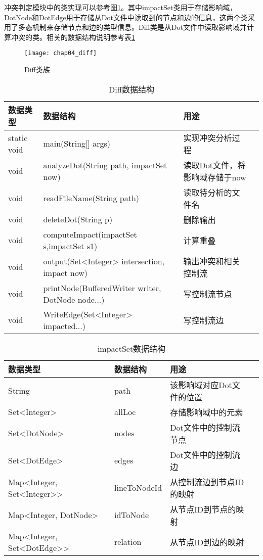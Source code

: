 冲突判定模块中的类实现可以参考图\ref {diff}。其中impactSet类用于存储影响域，DotNode和DotEdge用于存储从Dot文件中读取到的节点和边的信息，这两个类采用了多态机制来存储节点和边的类型信息。Diff类是从Dot文件中读取影响域并计算冲突的类。相关的数据结构说明参考表\ref {diff_data}

\begin{figure}[H]
	\centering
	\texttt{[image: chap04\_diff]}
	\caption {Diff类族}
	\label {diff}	
\end{figure}

\begin{table}[H]
	\caption{Diff数据结构}
	\label{diff_data}
	\centering
	\begin{tabular}{lllc}
		\toprule[1.5pt]
		{\heiti 数据类型} &{\heiti 数据结构} & {\heiti 用途} \\\midrule[1pt]
		static void & main(String[] args) & 实现冲突分析过程\\
		void & analyzeDot(String path, impactSet now) & 读取Dot文件，将影响域存储于now \\
		void & readFileName(String path) & 读取待分析的文件名\\
		void & deleteDot(String p) & 删除输出\\
		void & computeImpact(impactSet s,impactSet s1) & 计算重叠\\
		void & output(Set<Integer> intersection, impact now) & 输出冲突和相关控制流\\
		void & printNode(BufferedWriter writer, DotNode node...) & 写控制流节点\\
		void &  WriteEdge(Set<Integer>  impacted...) & 写控制流边\\
		\bottomrule[1.5pt] 
	\end{tabular}
\end{table}

\begin{table}[H]
	\caption{impactSet数据结构}
	\label{impact_data}
	\centering
	\begin{tabular}{lllc}
		\toprule[1.5pt]
		{\heiti 数据类型} &{\heiti 数据结构} & {\heiti 用途} \\\midrule[1pt]
		String     &  path & 该影响域对应Dot文件的位置 \\
		Set<Integer>  &  allLoc & 存储影响域中的元素 \\
		Set<DotNode>  & nodes & Dot文件中的控制流节点\\
		Set<DotEdge>  & edges & Dot文件中的控制流边\\
		Map<Integer, Set<Integer>> & lineToNodeId & 从控制流边到节点ID的映射\\
		Map<Integer, DotNode>  & idToNode & 从节点ID到节点的映射 \\
		Map<Integer, Set<DotEdge>>  &  relation & 从节点ID到边的映射 \\
		\bottomrule[1.5pt] 
	\end{tabular}
\end{table}

